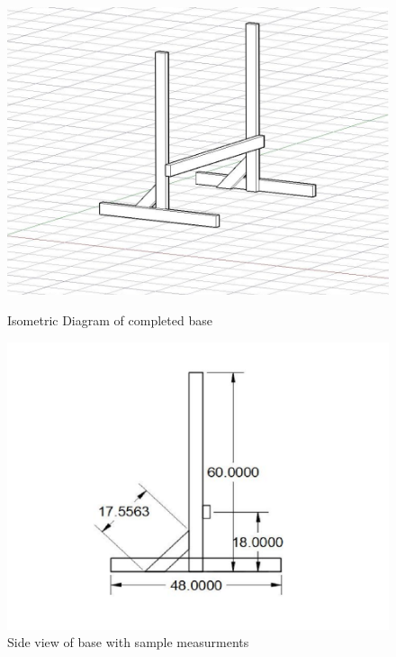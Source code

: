 \documentclass{article}
\begin{document}
            \begin{figure}[!htb]
                  \includegraphics[width=\linewidth]{base_3d}
                  \caption{Isometric Diagram of completed base}\label{fig:awesome_image1}
                \endminipage\hfill
                  \includegraphics[width=\linewidth]{base_side}
                  \caption{Side view of base with sample measurments}\label{fig:awesome_image2}
                \endminipage\hfill

\end{figure}
\end{document}
